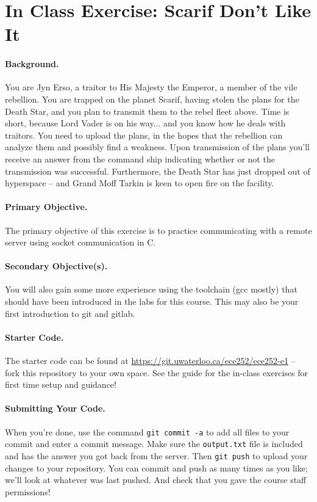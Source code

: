 




\section*{In Class Exercise: Scarif Don't Like It}

\paragraph{Background.}
You are Jyn Erso, a traitor to His Majesty the Emperor, a member of the vile rebellion. You are trapped on the planet Scarif, having stolen the plans for the Death Star, and you plan to transmit them to the rebel fleet above. Time is short, because Lord Vader is on his way... and you know how he deals with traitors. You need to upload the plans, in the hopes that the rebellion can analyze them and possibly find a weakness. Upon transmission of the plans you'll receive an answer from the command ship indicating whether or not the transmission was successful. Furthermore, the Death Star has just dropped out of hyperspace -- and Grand Moff Tarkin is keen to open fire on the facility.

\paragraph{Primary Objective.} The primary objective of this exercise is to practice communicating with a remote server using socket communication in C.

\paragraph{Secondary Objective(s).} You will also gain some more experience using the toolchain (gcc mostly) that should have been introduced in the labs for this course. This may also be your first introduction to git and gitlab.

\paragraph{Starter Code.} The starter code can be found at \url{https://git.uwaterloo.ca/ece252/ece252-e1} -- fork this repository to your own space. See the guide for the in-class exercises for first time setup and guidance!

\paragraph{Submitting Your Code.} When you're done, use the command \texttt{git commit -a} to add all files to your commit and enter a commit message. Make sure the \texttt{output.txt} file is included and has the answer you got back from the server. Then \texttt{git push} to upload your changes to your repository. You can commit and push as many times as you like; we'll look at whatever was last pushed. And check that you gave the course staff permissions!

